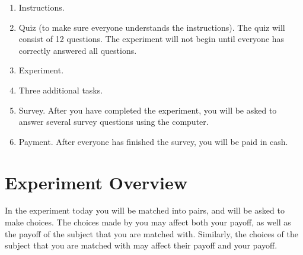 \documentclass[11pt]{article}
\newcommand{\dblbkt}[1]{}
\begin{document}
\begin{enumerate} 
\dblbkt{1} \item Instructions.
\dblbkt{1} \item Quiz (to make sure everyone understands the instructions).  The quiz will consist of 12 questions.  The experiment will not begin until everyone has correctly answered all questions.
\dblbkt{1} \item Experiment. 
\dblbkt{1} \item Three additional tasks.
\dblbkt{1} \item Survey. After you have completed the experiment, you will be asked to answer several survey questions using the computer.  
\dblbkt{1} \item Payment. After everyone has finished the survey, you will be paid in cash.
\end{enumerate} 


\section*{\dblbkt{3} Experiment Overview}

In the experiment today you will be \dblbkt{1} matched into pairs, and will be asked to make choices.  The choices made by you may \dblbkt{1} affect both your payoff, as well as \dblbkt{1} the payoff of the subject that you are matched with.  Similarly, the choices of the subject that you are matched with may \dblbkt{1} affect their payoff and your payoff.
\end{document}
